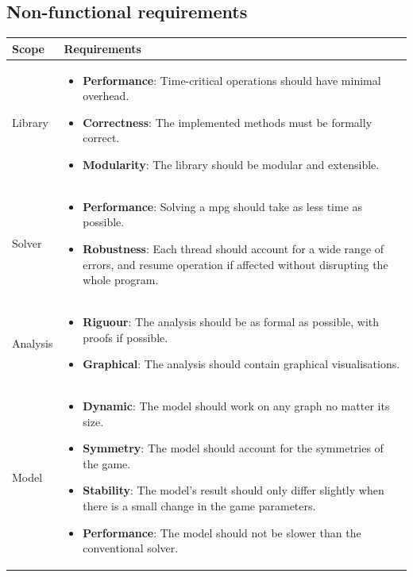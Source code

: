 \subsection{Non-functional requirements}
\begin{table}[h]
	\begin{tabularx}{\textwidth}{| p{3cm} | X |}
		\hline
		
		Scope & Requirements  \\
		\hline
		Library & \begin{itemize}
			\item \textbf{Performance}: Time-critical operations should have minimal overhead.
			\item \textbf{Correctness}: The implemented methods must be formally correct.
			\item \textbf{Modularity}: The library should be modular and extensible. 
		\end{itemize}\\
		\hline
		Solver & \begin{itemize}
			\item \textbf{Performance}: Solving a \acrshort{mpg} should take as less time as possible.
			\item \textbf{Robustness}: Each thread should account for a wide range of errors, and resume operation if affected without disrupting the whole program.
		\end{itemize} \\
		\hline
		Analysis & \begin{itemize}
			\item \textbf{Riguour}: The analysis should be as formal as possible, with proofs if possible.
			\item \textbf{Graphical}: The analysis should contain graphical visualisations.
		\end{itemize}\\
		\hline
		Model &\begin{itemize}
			\item \textbf{Dynamic}: The model should work on any graph no matter its size.
			\item \textbf{Symmetry}: The model should account for the symmetries of the game.
			\item \textbf{Stability}: The model's result should only differ slightly when there is a small change in the game parameters.
			\item \textbf{Performance}: The model should not be slower than the conventional solver.
		\end{itemize} \\

\end{tabularx}
\end{table}
